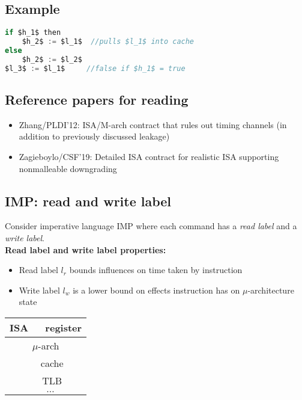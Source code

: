 \documentclass{article}
\begin{document}
\subsection{Example}

\begin{lstlisting}[mathescape,frame=single,basicstyle=\ttfamily,language=java,caption={Timing to update $l_3$ depends on the value of $h_1$.},captionpos=b]
if $h_1$ then
    $h_2$ := $l_1$  //pulls $l_1$ into cache
else 
    $h_2$ := $l_2$
$l_3$ := $l_1$     //false if $h_1$ = true
\end{lstlisting}

\subsection{Reference papers for reading}

\begin{itemize}
	\item{Zhang/PLDI'12: ISA/M-arch contract that rules out timing channels (in addition to previously discussed leakage)}
	\item{Zagieboylo/CSF'19: Detailed ISA contract for realistic ISA supporting nonmalleable downgrading}
\end{itemize}

\subsection{IMP: read and write label}

Consider imperative language IMP where each command has a \emph{read label} and a \emph{write label}. \\

\textbf{Read label and write label properties:}

\begin{itemize}
	\item{Read label $l_r$ bounds influences on time taken by instruction}
	\item{Write label $l_w$ is a lower bound on effects instruction has on $\mu$-architecture state}
\end{itemize}
\begin{tabular}{|c|}
\hline
ISA
$\quad$ register \\
\hline
$\mu$-arch \\
$\quad$ cache \\
$\quad$ TLB \\
$\quad \ldots$ \\
\hline
\end{tabular}\\ \\
\end{document}
